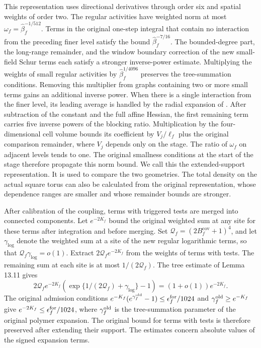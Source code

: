 \documentclass[11pt,a4paper]{article}
\numberwithin{equation}{section}
\begin{document}
This representation uses directional derivatives through order six and spatial weights of order two. The regular activities have weighted norm at most \(\omega_f=\widehat\beta_f^{-1/512}\). Terms in the original one-step integral that contain no interaction from the preceding finer level satisfy the bound \(\widehat\beta_f^{-7/16}\). The bounded-degree part, the long-range remainder, and the window boundary correction of the new small-field Schur terms each satisfy a stronger inverse-power estimate. Multiplying the weights of small regular activities by \(\widehat\beta_f^{1/4096}\) preserves the tree-summation conditions. Removing this multiplier from graphs containing two or more small terms gains an additional inverse power. When there is a single interaction from the finer level, its leading average is handled by the radial expansion of \cite[Lemma 13.6]{armstrong}. After subtraction of the constant and the full affine Hessian, the first remaining term carries five inverse powers of the blocking ratio. Multiplication by the four-dimensional cell volume bounds its coefficient by \(V_j/\ell_f\) plus the original comparison remainder, where \(V_j\) depends only on the stage. The ratio of \(\omega_f\) on adjacent levels tends to one. The original smallness conditions at the start of the stage therefore propagate this norm bound. We call this the extended-support representation. It is used to compare the two geometries. The total density on the actual square torus can also be calculated from the original representation, whose dependence ranges are smaller and whose remainder bounds are stronger.

After calibration of the coupling, terms with triggered tests are merged into connected components. Let \(e^{-2K_f}\) bound the original weighted sum at any site for these terms after integration and before merging. Set \(\mathcal Q_f=(2B_f^{\mathrm{cov}}+1)^4\), and let \(\gamma_{\log}\) denote the weighted sum at a site of the new regular logarithmic terms, so that \(\mathcal Q_f\gamma_{\log}=o(1)\). Extract \(2\mathcal Q_f e^{-2K_f}\) from the weights of terms with tests. The remaining sum at each site is at most \(1/(2\mathcal Q_f)\). The tree estimate of Lemma 13.11 gives
\[
 2\mathcal Q_f e^{-2K_f}
    \left(\exp\{1/(2\mathcal Q_f)+\gamma_{\log}\}-1\right)
 = (1+o(1))e^{-2K_f}.
\]
The original admission conditions \(e^{-K_f}(e^{\gamma_f^{\rm old}}-1)\le\epsilon_f^{\rm for}/1024\) and \(\gamma_f^{\rm old}\ge e^{-K_f}\) give \(e^{-2K_f}\le\epsilon_f^{\rm for}/1024\), where \(\gamma_f^{\rm old}\) is the tree-summation parameter of the original polymer expansion. The original bound for terms with tests is therefore preserved after extending their support. The estimates concern absolute values of the signed expansion terms.
\end{document}
